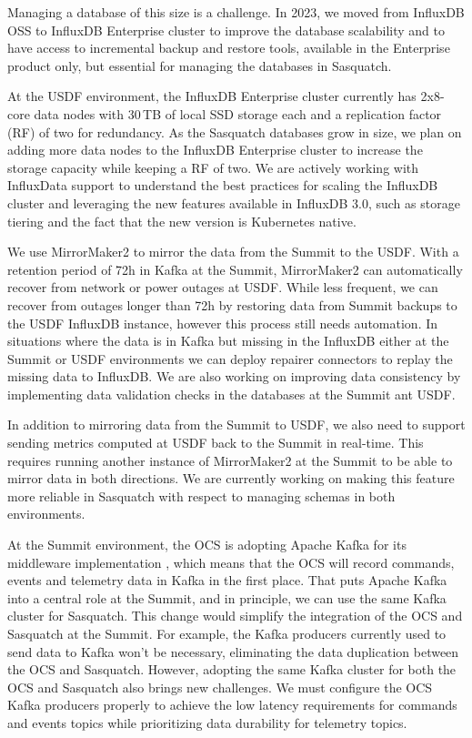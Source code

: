 Managing a database of this size is a challenge. In 2023, we moved from InfluxDB OSS to InfluxDB Enterprise cluster to improve the database scalability and to have access to incremental backup and restore tools, available in the Enterprise product only, but essential for managing the databases in Sasquatch.

At the USDF environment, the InfluxDB Enterprise cluster currently has 2x8-core data nodes with 30\,TB of local SSD storage each and a replication factor (RF) of two for redundancy. As the Sasquatch databases grow in size, we plan on adding more data nodes to the InfluxDB Enterprise cluster to increase the storage capacity while keeping a RF of two. We are actively working with InfluxData support to understand the best practices for scaling the InfluxDB cluster and leveraging the new features available in InfluxDB 3.0, such as storage tiering and the fact that the new version is Kubernetes native.

We use MirrorMaker2 to mirror the data from the Summit to the USDF. With a retention period of 72h in Kafka at the Summit, MirrorMaker2 can automatically recover from network or power outages at USDF. While less frequent, we can recover from outages longer than 72h by restoring data from Summit backups to the USDF InfluxDB instance, however this process still needs automation. In situations where the data is in Kafka but missing in the InfluxDB either at the Summit or USDF environments we can deploy repairer connectors to replay the missing data to InfluxDB. We are also working on improving data consistency by implementing data validation checks in the databases at the Summit ant USDF.

In addition to mirroring data from the Summit to USDF, we also need to support sending metrics computed at USDF back to the Summit in real-time. This requires running another instance of MirrorMaker2 at the Summit to be able to mirror data in both directions. We are currently working on making this feature more reliable in Sasquatch with respect to managing schemas in both environments.

At the Summit environment, the OCS is adopting Apache Kafka for its middleware implementation \cite{2024SPIE13101.59Ftmp, TSTN-033}, which means that the OCS will record commands, events and telemetry data in Kafka in the first place. That puts Apache Kafka into a central role at the Summit, and in principle, we can use the same Kafka cluster for Sasquatch. This change  would simplify the integration of the OCS and Sasquatch at the Summit. For example, the Kafka producers currently used to send data to Kafka won't be necessary, eliminating the data duplication between the OCS and Sasquatch. However, adopting the same Kafka cluster for both the OCS and Sasquatch also brings new challenges. We must configure the OCS Kafka producers properly to achieve the low latency requirements for commands and events topics while prioritizing data durability for telemetry topics.

